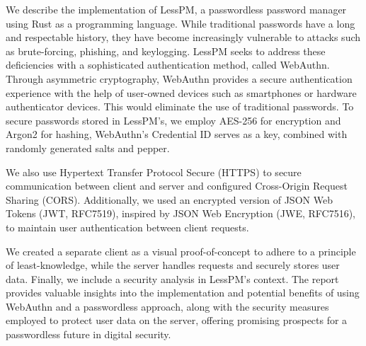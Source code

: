 We describe the implementation of LessPM, a passwordless password manager
using Rust as a programming language.
While traditional passwords have a long and respectable history, they have
become increasingly vulnerable to attacks such as brute-forcing, phishing, and
keylogging.
LessPM seeks to address these deficiencies with a sophisticated
authentication method, called WebAuthn.
Through asymmetric cryptography, WebAuthn provides a secure authentication
experience with the help of user-owned devices such as smartphones or hardware
authenticator devices.
This would eliminate the use of traditional passwords.
To secure passwords stored in LessPM's, we employ AES-256 for encryption and
Argon2 for hashing, WebAuthn's Credential ID serves as a key, combined with
randomly generated salts and pepper.

We also use Hypertext Transfer Protocol Secure (HTTPS) to secure
communication between client and server and configured Cross-Origin Request
Sharing (CORS).
Additionally, we used an encrypted version of JSON Web Tokens (JWT, RFC7519),
inspired by JSON Web Encryption (JWE, RFC7516), to maintain user authentication
between client requests.

We created a separate client as a visual proof-of-concept to adhere to a
principle of least-knowledge, while the server handles requests and securely
stores user data.
Finally, we include a security analysis in LessPM's context.
The report provides valuable insights into the implementation and potential
benefits of using WebAuthn and a passwordless approach, along with the security
measures employed to protect user data on the server, offering promising
prospects for a passwordless future in digital security.